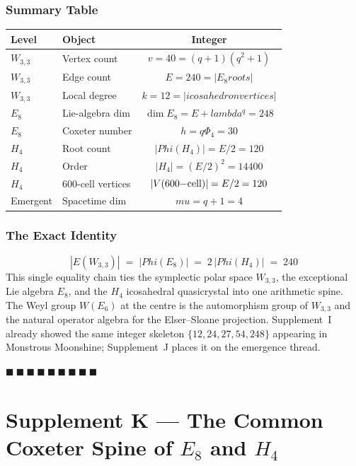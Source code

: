 \documentclass[12pt,a4paper]{article}
\def\text#1{#1}%
\def\lambda{lambda}%
\def\mu{mu}%
\def\Phi#1{Phi#1}%
\theoremstyle{definition}
\begin{document}
\section*{Summary Table}

\begin{longtable}{llc}
\toprule
Level & Object & Integer \\
\midrule \endhead
$W_{3,3}$ & Vertex count & $v = 40 = (q{+}1)(q^2{+}1)$ \\
$W_{3,3}$ & Edge count   & $E = 240 = |E_8 \text{ roots}|$ \\
$W_{3,3}$ & Local degree & $k = 12 = |\text{icosahedron vertices}|$ \\
$E_8$ & Lie-algebra dim  & $\dim E_8 = E+\lambda^q = 248$ \\
$E_8$ & Coxeter number   & $h = q\Phi_4 = 30$ \\
$H_4$ & Root count       & $|\Phi(H_4)| = E/2 = 120$ \\
$H_4$ & Order            & $|H_4| = (E/2)^2 = 14400$ \\
$H_4$ & 600-cell vertices& $|V(600{\rm -cell})| = E/2 = 120$ \\
Emergent & Spacetime dim & $\mu = q+1 = 4$ \\
\bottomrule
\end{longtable}

\section*{The Exact Identity}

\[
\boxed{\;|E(W_{3,3})| \;=\; |\Phi(E_8)| \;=\; 2\,|\Phi(H_4)| \;=\; 240\;}
\]
This single equality chain ties the symplectic polar space $W_{3,3}$,
the exceptional Lie algebra $E_8$, and the $H_4$ icosahedral
quasicrystal into one arithmetic spine. The Weyl group $W(E_6)$ at the
centre is the automorphism group of $W_{3,3}$ and the natural operator
algebra for the Elser--Sloane projection. Supplement~I already showed
the same integer skeleton $\{12,24,27,54,248\}$ appearing in Monstrous
Moonshine; Supplement~J places it on the emergence thread.

\hfill $\blacksquare\ \blacksquare\ \blacksquare\ \blacksquare\ \blacksquare\ \blacksquare\ \blacksquare\ \blacksquare\ \blacksquare$

\clearpage
\part*{Supplement K --- The Common Coxeter Spine of $E_8$ and $H_4$}
\end{document}
